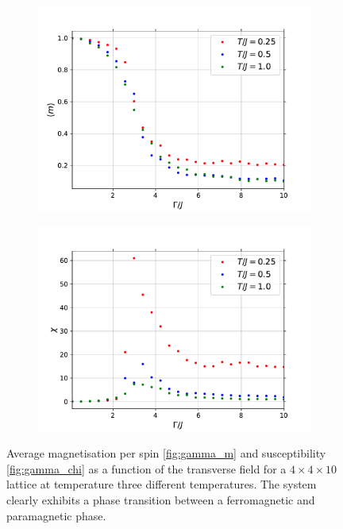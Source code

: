 \documentclass[11pt,openany]{article}
\begin{document}
\begin{figure}[H]
	\centering
	\begin{subfigure}{0.45\textwidth}
		\centering
		\caption{}
		\label{fig:gamma_m_T}
		\includegraphics[width=\textwidth]{Plots/gamma_transition_m_T.pdf}
	\end{subfigure}
	\begin{subfigure}{0.45\textwidth}
		\centering
		\caption{}
		\label{fig:gamma_chi_T}
		\includegraphics[width=\textwidth]{Plots/gamma_transition_chi_T.pdf}
	\end{subfigure}
	\caption{Average magnetisation per spin \ref{fig:gamma_m} and susceptibility \ref{fig:gamma_chi} as a function of the transverse field for a $4\times4\times10$ lattice at temperature three different temperatures. The system clearly exhibits a phase transition between a ferromagnetic and paramagnetic phase.}
	\label{fig:gamma_transition_T}
\end{figure}
\end{document}
